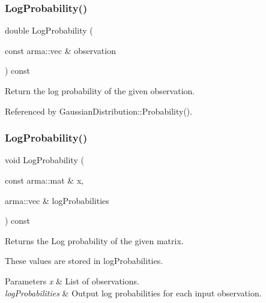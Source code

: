 \subsubsection{Log\+Probability()\hspace{0.1cm}{\footnotesize\ttfamily [1/2]}}
{\footnotesize\ttfamily double Log\+Probability (\begin{DoxyParamCaption}\item[{const arma\+::vec \&}]{observation }\end{DoxyParamCaption}) const}



Return the log probability of the given observation. 



Referenced by Gaussian\+Distribution\+::\+Probability().

\mbox{\label{classmlpack_1_1distribution_1_1GaussianDistribution_aabd4dbf56bd3d719aede447516d68296}} 
\subsubsection{Log\+Probability()\hspace{0.1cm}{\footnotesize\ttfamily [2/2]}}
{\footnotesize\ttfamily void Log\+Probability (\begin{DoxyParamCaption}\item[{const arma\+::mat \&}]{x,  }\item[{arma\+::vec \&}]{log\+Probabilities }\end{DoxyParamCaption}) const\hspace{0.3cm}{\ttfamily [inline]}}



Returns the Log probability of the given matrix. 

These values are stored in log\+Probabilities.


\begin{DoxyParams}{Parameters}
{\em x} & List of observations. \\
\hline
{\em log\+Probabilities} & Output log probabilities for each input observation. \\
\hline
\end{DoxyParams}


